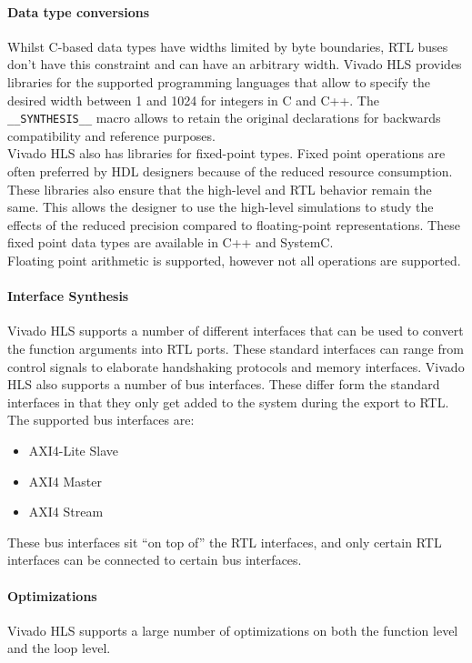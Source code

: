 \paragraph{Data type conversions}
Whilst C-based data types have widths limited by byte boundaries, RTL buses don't have this constraint and can have an arbitrary width. Vivado HLS provides libraries for the supported programming languages that allow to specify the desired width between 1 and 1024 for integers in C and C++. The \texttt{\_\_SYNTHESIS\_\_} macro allows to retain the original declarations for backwards compatibility and reference purposes.\\ Vivado HLS also has libraries for fixed-point types. Fixed point operations are often preferred by HDL designers because of the reduced resource consumption. These libraries also ensure that the high-level and RTL behavior remain the same. This allows the designer to use the high-level simulations to study the effects of the reduced precision compared to floating-point representations. These fixed point data types are available in C++ and SystemC.\\
Floating point arithmetic is supported, however not all operations are supported. 

\paragraph{Interface Synthesis}
Vivado HLS supports a number of different interfaces that can be used to convert the function arguments into RTL ports. These standard interfaces can range from control signals to elaborate handshaking protocols and memory interfaces. Vivado HLS also supports a number of bus interfaces. These differ form the standard interfaces in that they only get added to the system during the export to RTL. The supported bus interfaces are:
\begin{itemize}
	\item AXI4-Lite Slave
	\item AXI4 Master
	\item AXI4 Stream
\end{itemize}

These bus interfaces sit ``on top of'' the RTL interfaces, and only certain RTL interfaces can be connected to certain bus interfaces.

\paragraph{Optimizations}
Vivado HLS supports a large number of optimizations on both the function level and the loop level.

